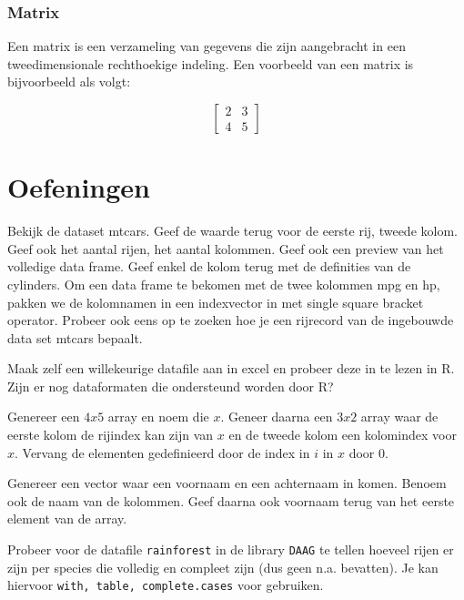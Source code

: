 

\subsubsection{Matrix}

Een matrix is een verzameling van gegevens die zijn aangebracht in een tweedimensionale rechthoekige indeling. Een voorbeeld van een matrix is bijvoorbeeld als volgt:

\[
\begin{bmatrix}
2 & 3 \\ 
4 & 5  
\end{bmatrix}
\]



\section{Oefeningen}

\begin{exercise}
  Bekijk de dataset mtcars. Geef de waarde terug voor de eerste rij, tweede kolom. Geef ook het aantal rijen, het aantal kolommen. Geef ook een preview van het volledige data frame. Geef enkel de kolom terug met de definities van de cylinders. Om een data frame te bekomen met de twee kolommen mpg en hp, pakken we de kolomnamen in een indexvector in met single square bracket operator. Probeer ook eens op te zoeken hoe je een rijrecord van de ingebouwde data set mtcars bepaalt.
\end{exercise}

\begin{exercise}
  Maak zelf een willekeurige datafile aan in excel en probeer deze in te lezen in R. Zijn er nog dataformaten die ondersteund worden door R?
\end{exercise}

\begin{exercise}
  Genereer een $4x5$ array en noem die $x$. Geneer daarna een $3x2$ array waar de eerste kolom de rijindex kan zijn van $x$ en de tweede kolom een kolomindex voor $x$. Vervang de elementen gedefinieerd door de index in $i$ in $x$ door 0. 
\end{exercise}

\begin{exercise}
  Genereer een vector waar een voornaam en een achternaam in komen. Benoem ook de naam van de kolommen. Geef daarna ook voornaam terug van het eerste element van de array. 
\end{exercise}

\begin{exercise}
  Probeer voor de datafile \texttt{rainforest} in de library \texttt{DAAG} te tellen hoeveel rijen er zijn per species die volledig en compleet zijn (dus geen n.a. bevatten). Je kan hiervoor \texttt{with, table, complete.cases} voor gebruiken. 
\end{exercise}

